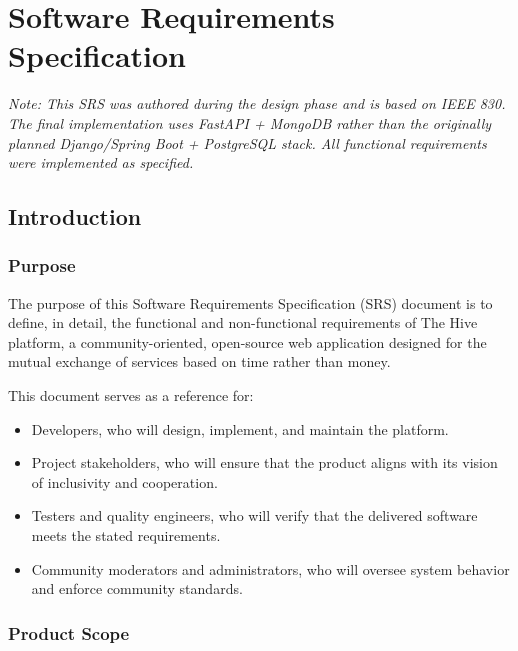 \documentclass[11pt,a4paper]{report}
\begin{document}
\chapter{Software Requirements Specification}

\textit{Note: This SRS was authored during the design phase and is based on IEEE 830. The final implementation uses FastAPI + MongoDB rather than the originally planned Django/Spring Boot + PostgreSQL stack. All functional requirements were implemented as specified.}

\section{Introduction}

\subsection{Purpose}

The purpose of this Software Requirements Specification (SRS) document is to define, in detail, the functional and non-functional requirements of The Hive platform, a community-oriented, open-source web application designed for the mutual exchange of services based on time rather than money.

This document serves as a reference for:
\begin{itemize}
    \item Developers, who will design, implement, and maintain the platform.
    \item Project stakeholders, who will ensure that the product aligns with its vision of inclusivity and cooperation.
    \item Testers and quality engineers, who will verify that the delivered software meets the stated requirements.
    \item Community moderators and administrators, who will oversee system behavior and enforce community standards.
\end{itemize}

\subsection{Product Scope}
\end{document}
